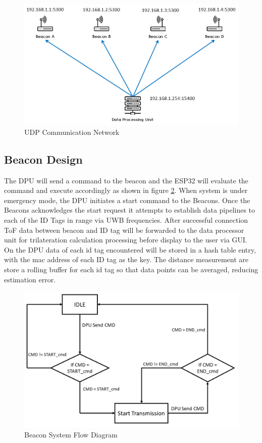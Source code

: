 \medskip
\begin{figure}[H]
\centering
    \includegraphics[width=\linewidth]{./images/UDP.png}
    \caption{UDP Communication Network}
    \label{udp}
\end{figure}
\medskip



\pagebreak
\subsection{Beacon Design}
The DPU will send a command to the beacon and the ESP32 will evaluate the command and execute accordingly as shown in figure \ref{bcn_flow}. When system is under emergency mode, the DPU initiates a start command to the Beacons. Once the Beacons acknowledges the start request it attempts to establish data pipelines to each of the ID Tags in range via UWB frequencies. After successful connection ToF data between beacon and ID tag will be forwarded to the data processor unit for trilateration calculation processing before display to the user via GUI. On the DPU data of each id tag encountered will be stored in a hash table entry, with the mac address of each ID tag as the key. The distance measurement are store a rolling buffer for each id tag so that data points can be averaged, reducing estimation error.\\

\bigskip
\begin{figure}[H]
\centering
    \includegraphics[width=\linewidth]{./images/beacon_flow.png}
    \caption{Beacon System Flow Diagram}
    \label{bcn_flow}
\end{figure}
\medskip

